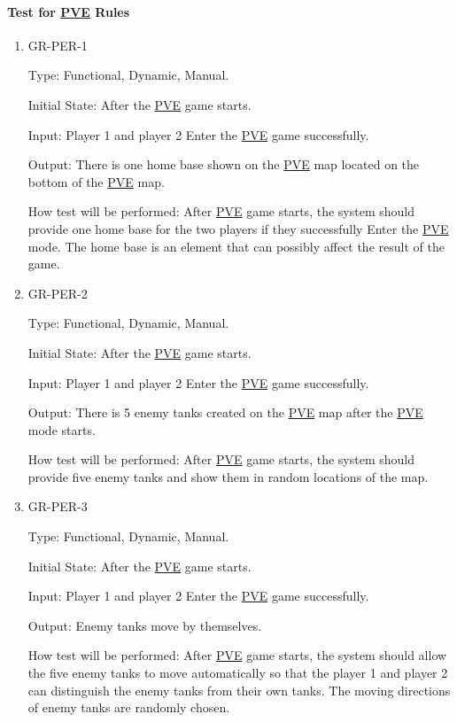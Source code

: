 \documentclass[12pt, titlepage]{article}
\begin{document}
\paragraph{Test for \underline{PVE} Rules}

\begin{enumerate}

\item{GR-PER-1\\}

Type: Functional, Dynamic, Manual.
					
Initial State: After the \underline{PVE} game starts.
					
Input: Player 1 and player 2 Enter the \underline{PVE} game successfully.
					
Output: There is one home base shown on the \underline{PVE} map located on the bottom of the \underline{PVE} map.
					
How test will be performed: After \underline{PVE} game starts, the system should provide one home base for the two players if they successfully Enter the \underline{PVE} mode. The home base is an element that can possibly affect the result of the game. 

\item{GR-PER-2\\}

Type: Functional, Dynamic, Manual.
					
Initial State: After the \underline{PVE} game starts.
					
Input: Player 1 and player 2 Enter the \underline{PVE} game successfully.
					
Output: There is 5 enemy tanks created on the \underline{PVE} map after the \underline{PVE} mode starts.
					
How test will be performed: After \underline{PVE} game starts, the system should provide five enemy tanks and show them in random locations of the map. 

\item{GR-PER-3\\}

Type: Functional, Dynamic, Manual.
					
Initial State: After the \underline{PVE} game starts.
					
Input: Player 1 and player 2 Enter the \underline{PVE} game successfully.
					
Output: Enemy tanks move by themselves. 
					
How test will be performed: After \underline{PVE} game starts, the system should allow the five enemy tanks to move automatically so that the player 1 and player 2 can distinguish the enemy tanks from their own tanks. The moving directions of enemy tanks are randomly chosen.


\end{enumerate}
\end{document}
